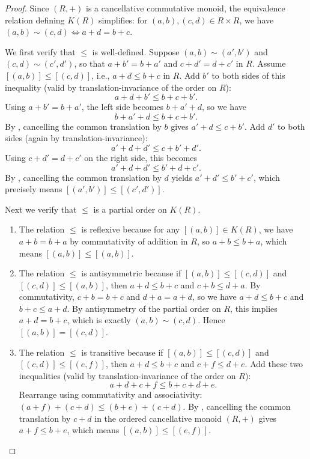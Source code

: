 \begin{proof}
    Since $(R,+)$ is a cancellative commutative monoid, the equivalence relation defining $K(R)$ simplifies: for $(a,b),(c,d) \in R \times R$, we have $(a,b) \sim (c,d) \iff a + d = b + c$.

    We first verify that $\leq$ is well-defined. Suppose $(a,b) \sim (a',b')$ and $(c,d) \sim (c',d')$, so that $a + b' = b + a'$ and $c + d' = d + c'$ in $R$. Assume $[(a,b)] \leq [(c,d)]$, i.e., $a + d \leq b + c$ in $R$. Add $b'$ to both sides of this inequality (valid by translation-invariance of the order on $R$):
    $$a + d + b' \leq b + c + b'.$$
    Using $a + b' = b + a'$, the left side becomes $b + a' + d$, so we have
    $$b + a' + d \leq b + c + b'.$$
    By , cancelling the common translation by $b$ gives $a' + d \leq c + b'$. Add $d'$ to both sides (again by translation-invariance):
    $$a' + d + d' \leq c + b' + d'.$$
    Using $c + d' = d + c'$ on the right side, this becomes
    $$a' + d + d' \leq b' + d + c'.$$
    By , cancelling the common translation by $d$ yields $a' + d' \leq b' + c'$, which precisely means $[(a',b')] \leq [(c',d')]$.

    Next we verify that $\leq$ is a partial order on $K(R)$.
    \begin{enumerate}
        \item The relation $\leq$ is reflexive because for any $[(a,b)] \in K(R)$, we have $a + b = b + a$ by commutativity of addition in $R$, so $a + b \leq b + a$, which means $[(a,b)] \leq [(a,b)]$.
        \item The relation $\leq$ is antisymmetric because if $[(a,b)] \leq [(c,d)]$ and $[(c,d)] \leq [(a,b)]$, then $a + d \leq b + c$ and $c + b \leq d + a$. By commutativity, $c + b = b + c$ and $d + a = a + d$, so we have $a + d \leq b + c$ and $b + c \leq a + d$. By antisymmetry of the partial order on $R$, this implies $a + d = b + c$, which is exactly $(a,b) \sim (c,d)$. Hence $[(a,b)] = [(c,d)]$.
        \item The relation $\leq$ is transitive because if $[(a,b)] \leq [(c,d)]$ and $[(c,d)] \leq [(e,f)]$, then $a + d \leq b + c$ and $c + f \leq d + e$. Add these two inequalities (valid by translation-invariance of the order on $R$):
        $$a + d + c + f \leq b + c + d + e.$$
        Rearrange using commutativity and associativity: $(a + f) + (c + d) \leq (b + e) + (c + d)$. By , cancelling the common translation by $c + d$ in the ordered cancellative monoid $(R,+)$ gives $a + f \leq b + e$, which means $[(a,b)] \leq [(e,f)]$.
    \end{enumerate}


\end{proof}
